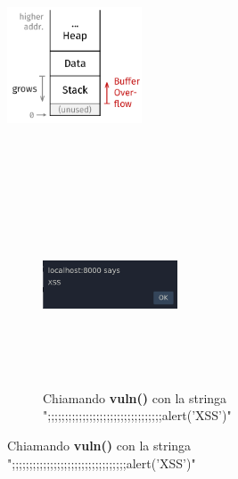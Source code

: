 \documentclass{beamer}
\begin{document}
\begin{frame}
\begin{columns}
\begin{column}{0.55\textwidth}
\begin{itemize}
            \end{itemize}
    \end{column}
    \begin{column}{0.45\textwidth}
      \begin{figure}[htbp]
        \includegraphics[width=4cm,height=6cm,keepaspectratio]{images/memory_layout.png}
        \newline
        \begin{figure}
          \includegraphics[width=4cm,height=6cm,keepaspectratio]{images/xss.png}
          \caption{Chiamando \textbf{vuln()} con la stringa
          ";;;;;;;;;;;;;;;;;;;;;;;;;;;;;;;;;alert('XSS')"}
        \end{figure}
        \end{figure}
    \end{column}
  \end{columns}
\end{frame}
\end{document}
